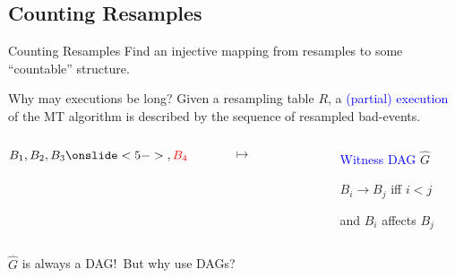 \documentclass{beamer}
\def\spadding{\vspace{0.25cm}}
\def\b{\textcolor{blue}}
\def\r{\textcolor{red}}
\begin{document}
\subsection{Counting Resamples}
\begin{frame}{Counting Resamples}
Find an injective mapping from resamples to some ``countable'' structure.\pause

\begin{block}{Why may executions be long?}
Given a resampling table $R$, a \b{(partial) execution} of the MT algorithm is described by the sequence of resampled bad-events.\pause\spadding

\begin{columns}
\begin{column}{.15\textwidth}
\centering $B_1, B_2, B_3\onslide<5->{, \r{B_4}}$
\end{column}
\begin{column}{.05\textwidth}
\centering $\mapsto$
\end{column}\pause
\begin{column}{.2\textwidth}
\centering\only<-4>{}
\end{column}
\begin{column}{.3\textwidth}
\b{Witness DAG} $\hat{G}$

$B_i \longrightarrow B_j$ iff $i < j$\par and $B_i$ affects $B_j$
\end{column}
\end{columns}\pause\pause

\follows $\hat{G}$ is always a DAG!\pause\ But why use DAGs?
\end{block}
\end{frame}
\end{document}
